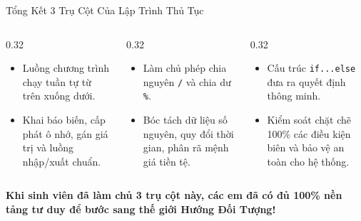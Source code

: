 \documentclass[aspectratio=169, 10pt]{beamer}
\begin{document}
\begin{frame}{Tổng Kết 3 Trụ Cột Của Lập Trình Thủ Tục}
  \begin{columns}[T]
    \begin{column}{0.32\textwidth}
      \begin{tcolorbox}[colback=UniLightBlue!30,colframe=UniNavy,title=\textbf{1. Tuần Tự (Sequence)}]
        \begin{itemize}
          \item Luồng chương trình chạy tuần tự từ trên xuống dưới.
          \item Khai báo biến, cấp phát ô nhớ, gán giá trị và luồng nhập/xuất chuẩn.
        \end{itemize}
      \end{tcolorbox}
    \end{column}
    \begin{column}{0.32\textwidth}
      \begin{tcolorbox}[colback=UniLightBlue!30,colframe=CSharpPurple,title=\textbf{2. Số Học \& Chia Dư}]
        \begin{itemize}
          \item Làm chủ phép chia nguyên \texttt{/} và chia dư \texttt{\%}.
          \item Bóc tách dữ liệu số nguyên, quy đổi thời gian, phân rã mệnh giá tiền tệ.
        \end{itemize}
      \end{tcolorbox}
    \end{column}
    \begin{column}{0.32\textwidth}
      \begin{tcolorbox}[colback=UniLightBlue!30,colframe=UniGreen,title=\textbf{3. Rẽ Nhánh (Branch)}]
        \begin{itemize}
          \item Cấu trúc \texttt{if...else} đưa ra quyết định thông minh.
          \item Kiểm soát chặt chẽ 100\% các điều kiện biên và bảo vệ an toàn cho hệ thống.
        \end{itemize}
      \end{tcolorbox}
    \end{column}
  \end{columns}
  \vskip10pt
  \begin{center}
    \textbf{\color{UniNavy}Khi sinh viên đã làm chủ 3 trụ cột này, các em đã có đủ 100\% nền tảng tư duy để bước sang thế giới Hướng Đối Tượng!}
  \end{center}
\end{frame}
\end{document}
